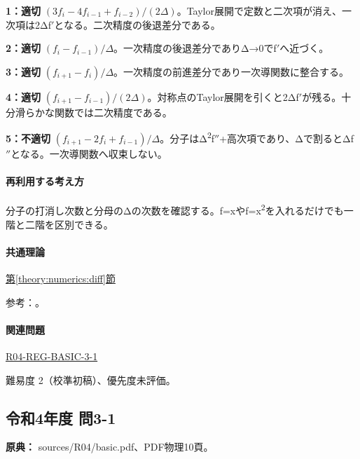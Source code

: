 \noindent\textbf{1：適切} \((3f_i-4f_{i-1}+f_{i-2})/(2\Delta)\)。Taylor展開で定数と二次項が消え、一次項は2Δf\ensuremath{'}となる。二次精度の後退差分である。\par

\noindent\textbf{2：適切} \((f_i-f_{i-1})/\Delta\)。一次精度の後退差分でありΔ→0でf\ensuremath{'}へ近づく。\par

\noindent\textbf{3：適切} \((f_{i+1}-f_i)/\Delta\)。一次精度の前進差分であり一次導関数に整合する。\par

\noindent\textbf{4：適切} \((f_{i+1}-f_{i-1})/(2\Delta)\)。対称点のTaylor展開を引くと2Δf\ensuremath{'}が残る。十分滑らかな関数では二次精度である。\par

\noindent\textbf{5：不適切} \((f_{i+1}-2f_i+f_{i-1})/\Delta\)。分子はΔ\textsuperscript{2}f\ensuremath{''}+高次項であり、Δで割るとΔf\ensuremath{''}となる。一次導関数へ収束しない。\par

\paragraph{再利用する考え方} 分子の打消し次数と分母のΔの次数を確認する。f=\allowbreak{}xやf=\allowbreak{}x\textsuperscript{2}を入れるだけでも一階と二階を区別できる。

\paragraph{共通理論} \hyperref[theory:numerics:diff]{第\ref*{theory:numerics:diff}節}

\par 参考：\cite{nist_differentiation}。

\paragraph{関連問題} \hyperref[q:r04-reg-basic-3-1]{R04-REG-BASIC-3-1}

\par 難易度 2（校準初稿）、優先度未評価。

\subsection{令和4年度 問3-1}
\label{q:r04-reg-basic-3-1}

\noindent\textbf{原典：} sources/R04/basic.pdf、PDF物理10頁。

